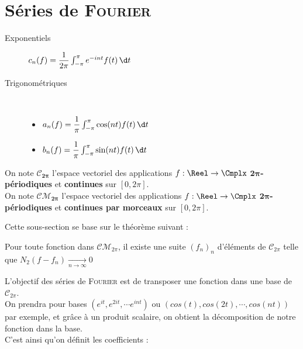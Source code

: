 \documentclass[11pt,a4paper,fleqn,pdftex]{report}
\begin{document}
\section{Séries de \textsc{Fourier}}
\begin{methode}
\begin{description}
\item[Exponentiels] $c_n(f) = \dfrac{1}{2\pi} \int_{-\pi}^{\pi}e^{-int} f(t)\, \d t$
\item[Trigonométriques] \hfill \\[-10pt]
	\begin{itemize}\itemsep2pt
		\item $a_n(f) = \dfrac{1}{\pi} \int_{-\pi}^{\pi} \cos (nt) f(t)\, \d t$
		\item $b_n(f) = \dfrac{1}{\pi} \int_{-\pi}^{\pi} \sin (nt) f(t)\, \d t$
	\end{itemize}
\end{description}
\end{methode}
On note $\boldsymbol{ \mathcal{C}_{2\pi}}$ l'espace vectoriel des applications $f : \Reel \to \Cmplx$ \textbf{{$\boldsymbol{ 2\pi}$-périodiques}} et \textbf{continues} sur $[0,2\pi]$.\\
On note $\boldsymbol{ \mathcal{CM}_{2\pi}}$ l'espace vectoriel des applications $f : \Reel \to \Cmplx$ \textbf{{$\boldsymbol{ 2\pi}$-périodiques}} et \textbf{continues par morceaux} sur $[0,2\pi]$.\\[3pt]

Cette sous-section se base sur le théorème suivant : 
\begin{theorem}
Pour toute fonction dans $\mathcal{CM}_{2\pi}$, il existe une suite $\left( f_n \right)_n$ d'éléments de $\mathcal{C}_{2\pi}$ telle que $\boxed{N_2(f-f_n)\xrightarrow[n\to\infty]{} 0}$
\end{theorem}

L'objectif des séries de \textsc{Fourier} est de \og transposer \fg une fonction dans une base de $\mathcal{C}_{2\pi}$. \\

On prendra pour bases $(e^{it},e^{2it},\cdots e^{int})$ ou $\left( cos(t),cos(2t),\cdots ,cos(nt)\right)$ par exemple, et grâce à un produit scalaire, on obtient la décomposition de notre fonction dans la base.\\
C'est ainsi qu'on définit les coefficients : 
\end{document}
